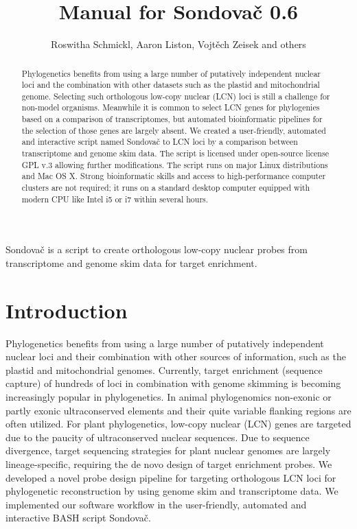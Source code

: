 \documentclass[a4paper, 11pt, twoside]{article}
\title{Manual for Sondovač 0.6}
\author{Roswitha Schmickl, Aaron Liston, Vojtěch Zeisek and others}
\begin{document}
\maketitle
Sondovač is a script to create orthologous low-copy nuclear probes from transcriptome and genome skim data for target enrichment.
\tableofcontents
\listoffigures
\listoftables
\vskip 1cm



\begin{abstract}
Phylogenetics benefits from using a large number of putatively independent nuclear loci and the combination with other datasets such as the plastid and mitochondrial genome. Selecting such orthologous low-copy nuclear (LCN) loci is still a challenge for non-model organisms. Meanwhile it is common to select LCN genes for phylogenies based on a comparison of transcriptomes, but automated bioinformatic pipelines for the selection of those genes are largely absent. We created a user-friendly, automated and interactive script named Sondovač to LCN loci by a comparison between transcriptome and genome skim data. The script is licensed under open-source license GPL v.3 allowing further modifications. The script runs on major Linux distributions and Mac OS X. Strong bioinformatic skills and access to high-performance computer clusters are not required; it runs on a standard desktop computer equipped with modern CPU like Intel i5 or i7 within several hours.
\end{abstract}

\section{Introduction}

Phylogenetics benefits from using a large number of putatively independent nuclear loci and their combination with other sources of information, such as the plastid and mitochondrial genomes. Currently, target enrichment (sequence capture) of hundreds of loci in combination with genome skimming is becoming increasingly popular in phylogenetics. In animal phylogenomics non-exonic or partly exonic ultraconserved elements and their quite variable flanking regions are often utilized. For plant phylogenetics, low-copy nuclear (LCN) genes are targeted due to the paucity of ultraconserved nuclear sequences. Due to sequence divergence, target sequencing strategies for plant nuclear genomes are largely lineage-specific, requiring the de novo design of target enrichment probes. We developed a novel probe design pipeline for targeting orthologous LCN loci for phylogenetic reconstruction by using genome skim and transcriptome data. We implemented our software workflow in the user-friendly, automated and interactive BASH script Sondovač.
\end{document}
